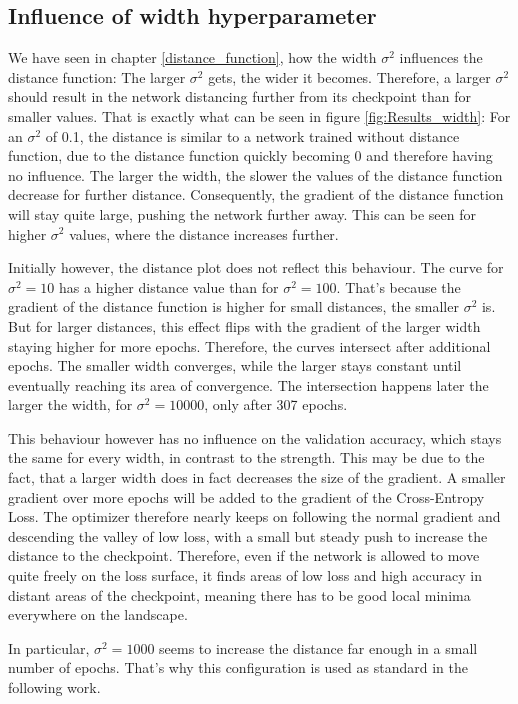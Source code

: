 \subsection{Influence of width hyperparameter}
We have seen in chapter \ref{distance_function}, how the width $\sigma^2$
influences the distance function: The larger $\sigma^2$ gets, the wider it
becomes. Therefore, a larger $\sigma^2$ should result in the network distancing
further from its checkpoint than for smaller values. That is exactly what can be
seen in figure \ref{fig:Results_width}: For an $\sigma^2$ of 0.1, the distance
is similar to a network trained without distance function, due to the
distance function quickly becoming 0 and therefore having no influence. The
larger the width, the slower the values of the distance function decrease for further
distance. Consequently, the gradient of the distance function will stay quite
large, pushing the network further away. This can be seen for higher $\sigma^2$
values, where the distance increases further.


Initially however, the distance plot does not reflect this behaviour. The curve
for $\sigma^2 = 10$ has a higher distance value than for $\sigma^2 = 100$.
That's because the gradient of the distance function is higher for small
distances, the smaller $\sigma^2$ is. But for larger distances, this effect flips
with the gradient of the larger width staying higher for more epochs. Therefore,
the curves intersect after additional epochs. The smaller width converges, while
the larger stays constant until eventually reaching its area of convergence.
The intersection happens later the larger the width, for $\sigma^2 = 10000$,
only after 307 epochs.

This behaviour however has no influence on the validation accuracy, which stays
the same for every width, in contrast to the strength. This may be due to the
fact, that a larger width does in fact decreases the size of the gradient. A
smaller gradient over more epochs will be added to the gradient of the
Cross-Entropy Loss. The optimizer therefore nearly keeps on following the normal
gradient and descending the valley of low loss, with a small but steady push to
increase the distance to the checkpoint. Therefore, even if the network is
allowed to move quite freely on the loss surface, it finds areas of low loss and
high accuracy in distant areas of the checkpoint, meaning there has to be good
local minima everywhere on the landscape.

In particular, $\sigma^2 = 1000$ seems to increase the distance far enough in a
small number of epochs. That's why this configuration is used as standard in the
following work.

